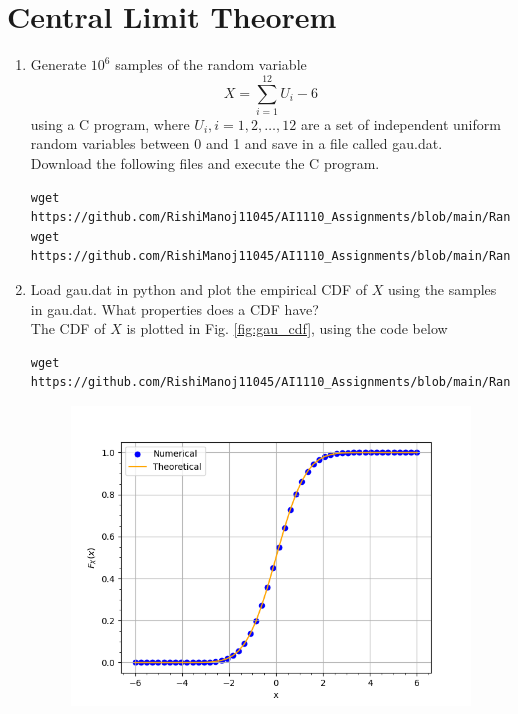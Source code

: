\documentclass[journal,12pt,twocolumn]{IEEEtran}
\renewcommand\thesection{\arabic{section}}
\begin{document}
\section{Central Limit Theorem}
%
\begin{enumerate}[label=\thesection.\arabic*
,ref=\thesection.\theenumi]
%
\item
Generate $10^6$ samples of the random variable
%
\begin{equation}
X = \sum_{i=1}^{12}U_i -6
\end{equation}
%
using a C program, where $U_i, i = 1,2,\dots, 12$ are  a set of independent uniform random variables between 0 and 1
and save in a file called gau.dat.\\
\solution Download the following files and execute the  C program.
\begin{lstlisting}
wget https://github.com/RishiManoj11045/AI1110_Assignments/blob/main/RandomNumbers/codes/gau_rand.c
wget https://github.com/RishiManoj11045/AI1110_Assignments/blob/main/RandomNumbers/codes/coeffs.h
\end{lstlisting}
%
\item
Load gau.dat in python and plot the empirical CDF of $X$ using the samples in gau.dat. What properties does a CDF have?
\\
\solution The CDF of $X$ is plotted in Fig. \ref{fig:gau_cdf}, using the code below\\
\begin{lstlisting}
wget https://github.com/RishiManoj11045/AI1110_Assignments/blob/main/RandomNumbers/codes/gaussian_cdf.py
\end{lstlisting}
\begin{figure}[ht]
\centering
\includegraphics[width=\columnwidth]{figs/gau_cdf.png}

\end{figure}
\end{enumerate}
\end{document}
